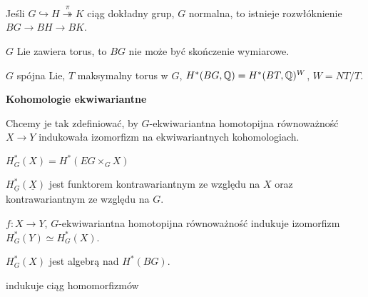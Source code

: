  \begin{twierdzenie}
  Jeśli $G \hookrightarrow H \overset{\pi}{\twoheadrightarrow} K$ ciąg dokładny grup, $G$ normalna, to istnieje rozwłóknienie $BG \to BH \to BK$.
 \end{twierdzenie}
 
 \begin{uwaga}
  $G$ Lie zawiera torus, to $BG$ nie może być skończenie wymiarowe.
 \end{uwaga}
 
 \begin{twierdzeniebd}
  $G$ spójna Lie, $T$ maksymalny torus w $G$, $H^\ast(BG, {\mathbb{Q}}) = H^\ast(BT,{\mathbb{Q}})^W$, $W=NT/T$.
 \end{twierdzeniebd}
 \pagebreak
 {\bf Kohomologie ekwiwariantne}
 
 Chcemy je tak zdefiniować, by $G$-ekwiwariantna homotopijna równoważność $X \to Y$ indukowała izomorfizm na ekwiwariantnych kohomologiach.
 
 \begin{definicja}
  $H_G^\ast(X) = H^\ast(EG \times_G X)$
 \end{definicja}
 
 \begin{uwaga}
  $H^\ast_{\underline{G}}(\underline{X})$ jest funktorem kontrawariantnym ze względu na $X$ oraz kontrawariantnym ze względu na $G$.
 \end{uwaga}
 
 \begin{twierdzenie}
  $f:X \to Y$, $G$-ekwiwariantna homotopijna równoważność indukuje izomorfizm $H_G^\ast(Y) \simeq H_G^\ast(X)$.
 \end{twierdzenie}
 
 \begin{uwaga}
  $H_G^\ast(X)$ jest algebrą nad $H^\ast(BG)$.
 \end{uwaga}
 
 \begin{uwaga}
  indukuje ciąg homomorfizmów 
 \end{uwaga}
 
